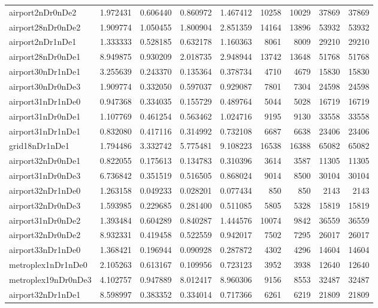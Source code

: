 \begin{longtable}{|l|r|r|r|r|r|r|r|r|}
airport2nDr0nDe2 & 1.972431 & 0.606440 & 0.860972 & 1.467412 & 10258 & 10029 & 37869 & 37869 \\
airport28nDr0nDe2 & 1.909774 & 1.050455 & 1.800904 & 2.851359 & 14164 & 13896 & 53932 & 53932 \\
airport2nDr1nDe1 & 1.333333 & 0.528185 & 0.632178 & 1.160363 & 8061 & 8009 & 29210 & 29210 \\
airport28nDr0nDe1 & 8.949875 & 0.930209 & 2.018735 & 2.948944 & 13742 & 13648 & 51768 & 51768 \\
airport30nDr1nDe1 & 3.255639 & 0.243370 & 0.135364 & 0.378734 & 4710 & 4679 & 15830 & 15830 \\
airport30nDr0nDe3 & 1.909774 & 0.332050 & 0.597037 & 0.929087 & 7801 & 7304 & 24598 & 24598 \\
airport31nDr1nDe0 & 0.947368 & 0.334035 & 0.155729 & 0.489764 & 5044 & 5028 & 16719 & 16719 \\
airport31nDr0nDe1 & 1.107769 & 0.461254 & 0.563462 & 1.024716 & 9195 & 9130 & 33558 & 33558 \\
airport31nDr1nDe1 & 0.832080 & 0.417116 & 0.314992 & 0.732108 & 6687 & 6638 & 23406 & 23406 \\
grid18nDr1nDe1 & 1.794486 & 3.332742 & 5.775481 & 9.108223 & 16538 & 16388 & 65082 & 65082 \\
airport32nDr0nDe1 & 0.822055 & 0.175613 & 0.134783 & 0.310396 & 3614 & 3587 & 11305 & 11305 \\
airport31nDr0nDe3 & 6.736842 & 0.351519 & 0.516505 & 0.868024 & 9014 & 8500 & 30104 & 30104 \\
airport32nDr1nDe0 & 1.263158 & 0.049233 & 0.028201 & 0.077434 & 850 & 850 & 2143 & 2143 \\
airport32nDr0nDe3 & 1.593985 & 0.229685 & 0.281400 & 0.511085 & 5805 & 5328 & 15819 & 15819 \\
airport31nDr0nDe2 & 1.393484 & 0.604289 & 0.840287 & 1.444576 & 10074 & 9842 & 36559 & 36559 \\
airport32nDr0nDe2 & 8.932331 & 0.419458 & 0.522559 & 0.942017 & 7502 & 7295 & 26017 & 26017 \\
airport33nDr1nDe0 & 1.368421 & 0.196944 & 0.090928 & 0.287872 & 4302 & 4296 & 14604 & 14604 \\
metroplex1nDr1nDe0 & 2.105263 & 0.613167 & 0.109956 & 0.723123 & 3952 & 3938 & 12640 & 12640 \\
metroplex19nDr0nDe3 & 4.102757 & 0.947889 & 8.012417 & 8.960306 & 9156 & 8553 & 32487 & 32487 \\
airport32nDr1nDe1 & 8.598997 & 0.383352 & 0.334014 & 0.717366 & 6261 & 6219 & 21809 & 21809 \\

\end{longtable}
